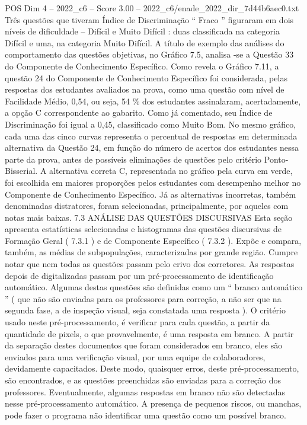 \begin{textsample}{POS Dim 4 – 2022\_c6 – Score 3.00 – 2022\_c6/enade\_2022\_dir\_7d44b6aec0.txt}
Três questões que tiveram Índice de Discriminação “ Fraco ” figuraram em dois níveis de dificuldade – Difícil e Muito Difícil : duas classificada na categoria Difícil e uma, na categoria Muito Difícil.
A título de exemplo das análises do comportamento das questões objetivas, no Gráfico 7.5, analisa -se a Questão 33 do Componente de Conhecimento Específico.
Como revela o Gráfico 7.11, a questão 24 do Componente de Conhecimento Específico foi considerada, pelas respostas dos estudantes avaliados na prova, como uma questão com nível de Facilidade Médio, 0,54, ou seja, 54 \% dos estudantes assinalaram, acertadamente, a opção C correspondente ao gabarito.
Como já comentado, seu Índice de Discriminação foi igual a 0,45, classificado como Muito Bom.
No mesmo gráfico, cada uma das cinco curvas representa o percentual de respostas em determinada alternativa da Questão 24, em função do número de acertos dos estudantes nessa parte da prova, antes de possíveis eliminações de questões pelo critério Ponto-Bisserial.
A alternativa correta C, representada no gráfico pela curva em verde, foi escolhida em maiores proporções pelos estudantes com desempenho melhor no Componente de Conhecimento Específico.
Já as alternativas incorretas, também denominadas distratores, foram selecionadas, principalmente, por aqueles com notas mais baixas. 7.3 ANÁLISE DAS QUESTÕES DISCURSIVAS Esta seção apresenta estatísticas selecionadas e histogramas das questões discursivas de Formação Geral ( 7.3.1 ) e de Componente Específico ( 7.3.2 ).
Expõe e compara, também, as médias de subpopulações, caracterizadas por grande região.
Cumpre notar que nem todas as questões passam pelo crivo dos corretores.
As respostas depois de digitalizadas passam por um pré-processamento de identificação automático.
Algumas destas questões são definidas como um “ branco automático ” ( que não são enviadas para os professores para correção, a não ser que na segunda fase, a de inspeção visual, seja constatada uma resposta ).
O critério usado neste pré-processamento, é verificar para cada questão, a partir da quantidade de pixels, o que provavelmente, é uma resposta em branco.
A partir da separação destes documentos que foram considerados em branco, eles são enviados para uma verificação visual, por uma equipe de colaboradores, devidamente capacitados.
Deste modo, quaisquer erros, deste pré-processamento, são encontrados, e as questões preenchidas são enviadas para a correção dos professores.
Eventualmente, algumas respostas em branco não são detectadas nesse pré-processamento automático.
A presença de pequenos riscos, ou manchas, pode fazer o programa não identificar uma questão como um possível branco.

\end{textsample}
